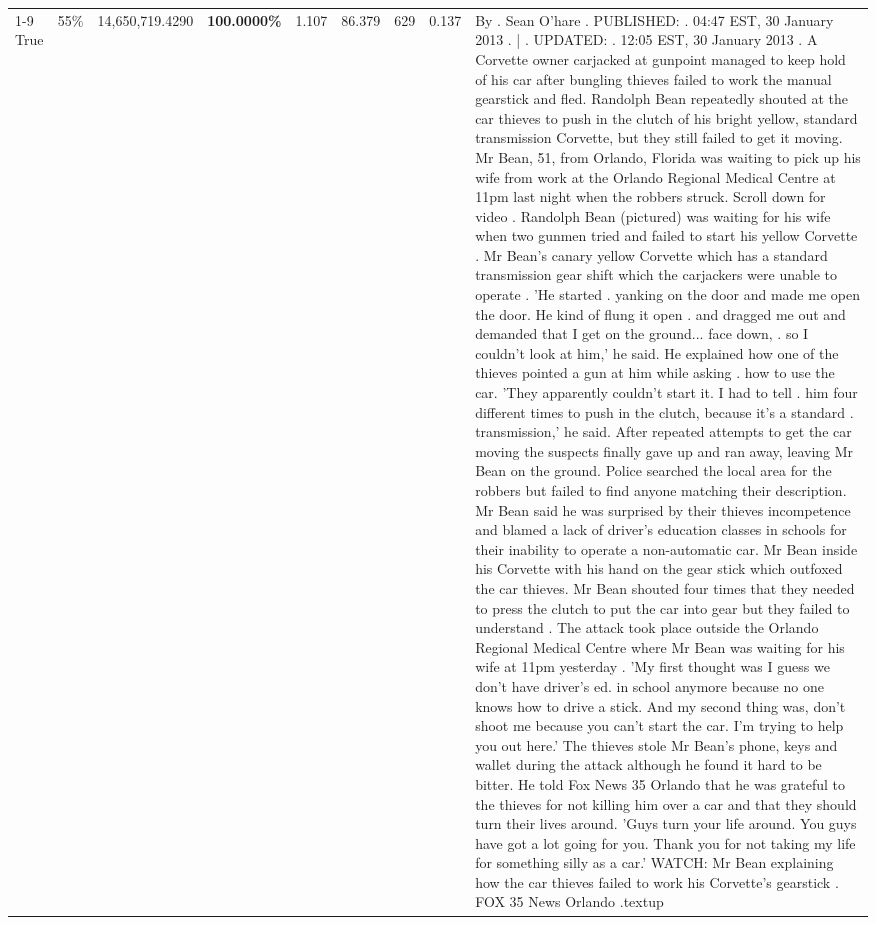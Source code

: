 \begin{table}[H]
\begin{tabular}{lllrlllll}
\cline{1-9} \cline{2-9}
True & 55\% & 14,650,719.4290 & \bfseries \color{red} 100.0000\% & 1.107 & 86.379 & 629 & 0.137 & By . Sean O'hare . PUBLISHED: . 04:47 EST, 30 January 2013 . | . UPDATED: . 12:05 EST, 30 January 2013 . A Corvette owner carjacked at gunpoint managed to keep hold of his car after bungling thieves failed to work the manual gearstick and fled. Randolph Bean repeatedly shouted at the car thieves to push in the clutch of his bright yellow, standard transmission Corvette, but they still failed to get it moving. Mr Bean, 51, from Orlando, Florida was waiting to pick up his wife from work at the Orlando Regional Medical Centre at 11pm last night when the robbers struck. Scroll down for video . Randolph Bean (pictured) was waiting for his wife when two gunmen tried and failed to start his yellow Corvette . Mr Bean's canary yellow Corvette which has a standard transmission gear shift which the carjackers were unable to operate . 'He started . yanking on the door and made me open the door. He kind of flung it open . and dragged me out and demanded that I get on the ground... face down, . so I couldn't look at him,' he said. He explained how one of the thieves pointed a gun at him while asking . how to use the car. 'They apparently couldn't start it. I had to tell . him four different times to push in the clutch, because it's a standard . transmission,' he said. After repeated attempts to get the car moving the suspects finally gave up and ran away, leaving Mr Bean on the ground. Police searched the local area for the robbers but failed to find anyone matching their description. Mr Bean said he was surprised by their thieves incompetence and blamed a lack of driver's education classes in schools for their inability to operate a non-automatic car. Mr Bean inside his Corvette with his hand on the gear stick which outfoxed the car thieves. Mr Bean shouted four times that they needed to press the clutch to put the car into gear but they failed to understand . The attack took place outside the Orlando Regional Medical Centre where Mr Bean was waiting for his wife at 11pm yesterday . 'My first thought was I guess we don't have driver's ed. in school anymore because no one knows how to drive a stick. And my second thing was, don't shoot me because you can't start the car. I'm trying to help you out here.' The thieves stole Mr Bean's phone, keys and wallet during the attack although he found it hard to be bitter. He told Fox News 35 Orlando that he was grateful to the thieves for not killing him over a car and that they should turn their lives around. 'Guys turn your life around. You guys have got a lot going for you. Thank you for not taking my life for something silly as a car.' WATCH: Mr Bean explaining how the car thieves failed to work his Corvette's gearstick . FOX 35 News Orlando .textup \\

\end{tabular}
\end{table}
